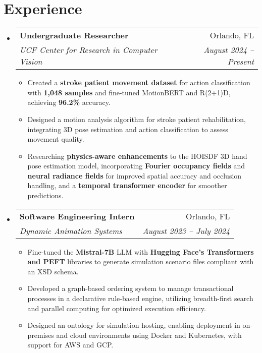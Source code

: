 \documentclass[letterpaper,11pt]{article}
\makeatletter
\newcommand{\resumeItem}[1]{
  \item\small{
    {#1 \vspace{-2pt}}
  }
}
\newcommand{\resumeSubheading}[4]{
  \vspace{-2pt}\item
    \begin{tabular*}{0.97\textwidth}[t]{l@{\extracolsep{\fill}}r}
      \textbf{#1} & #2 \\
      \textit{\small#3} & \textit{\small #4} \\
    \end{tabular*}\vspace{-7pt}
}
\newcommand{\resumeSubHeadingListStart}{\begin{itemize}[leftmargin=0.15in, label={}]}
\newcommand{\resumeSubHeadingListEnd}{\end{itemize}}
\newcommand{\resumeItemListStart}{\begin{itemize}}
\newcommand{\resumeItemListEnd}{\end{itemize}\vspace{-5pt}}
\makeatother
\begin{document}
\section{Experience}
  \resumeSubHeadingListStart
    \resumeSubheading
      {Undergraduate Researcher}{Orlando, FL}
      {UCF Center for Research in Computer Vision}{August 2024 -- Present}
      \resumeItemListStart
        \resumeItem{Created a \textbf{stroke patient movement dataset} for action classification with \textbf{1,048 samples} and fine-tuned MotionBERT and R(2+1)D, achieving \textbf{96.2\%} accuracy.}
        \resumeItem{Designed a motion analysis algorithm for stroke patient rehabilitation, integrating 3D pose estimation and action classification to assess movement quality.}
        \resumeItem{Researching \textbf{physics-aware enhancements} to the HOISDF 3D hand pose estimation model, incorporating \textbf{Fourier occupancy fields} and \textbf{neural radiance fields} for improved spatial accuracy and occlusion handling, and a \textbf{temporal transformer encoder} for smoother predictions.}
      \resumeItemListEnd
    \resumeSubheading
      {Software Engineering Intern}{Orlando, FL}
      {Dynamic Animation Systems}{August 2023 -- July 2024}
      \resumeItemListStart
        \resumeItem{Fine-tuned the \textbf{Mistral-7B} LLM with \textbf{Hugging Face's Transformers and PEFT} libraries to generate simulation scenario files compliant with an XSD schema.}
        \resumeItem{Developed a graph-based ordering system to manage transactional processes in a declarative rule-based engine, utilizing breadth-first search and parallel computing for optimized execution efficiency.}
        \resumeItem{Designed an ontology for simulation hosting, enabling deployment in on-premises and cloud environments using Docker and Kubernetes, with support for AWS and GCP.}
      \resumeItemListEnd
  \resumeSubHeadingListEnd
\end{document}
